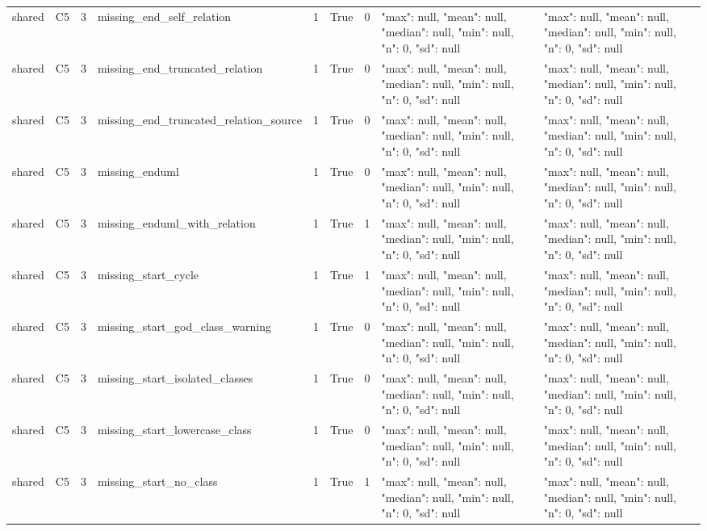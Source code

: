 \begin{tabular}{lllllllll}
shared & C5 & 3 & missing\_end\_self\_relation & 1 & True & 0 & {"max": null, "mean": null, "median": null, "min": null, "n": 0, "sd": null} & {"max": null, "mean": null, "median": null, "min": null, "n": 0, "sd": null} \\
shared & C5 & 3 & missing\_end\_truncated\_relation & 1 & True & 0 & {"max": null, "mean": null, "median": null, "min": null, "n": 0, "sd": null} & {"max": null, "mean": null, "median": null, "min": null, "n": 0, "sd": null} \\
shared & C5 & 3 & missing\_end\_truncated\_relation\_source & 1 & True & 0 & {"max": null, "mean": null, "median": null, "min": null, "n": 0, "sd": null} & {"max": null, "mean": null, "median": null, "min": null, "n": 0, "sd": null} \\
shared & C5 & 3 & missing\_enduml & 1 & True & 0 & {"max": null, "mean": null, "median": null, "min": null, "n": 0, "sd": null} & {"max": null, "mean": null, "median": null, "min": null, "n": 0, "sd": null} \\
shared & C5 & 3 & missing\_enduml\_with\_relation & 1 & True & 1 & {"max": null, "mean": null, "median": null, "min": null, "n": 0, "sd": null} & {"max": null, "mean": null, "median": null, "min": null, "n": 0, "sd": null} \\
shared & C5 & 3 & missing\_start\_cycle & 1 & True & 1 & {"max": null, "mean": null, "median": null, "min": null, "n": 0, "sd": null} & {"max": null, "mean": null, "median": null, "min": null, "n": 0, "sd": null} \\
shared & C5 & 3 & missing\_start\_god\_class\_warning & 1 & True & 0 & {"max": null, "mean": null, "median": null, "min": null, "n": 0, "sd": null} & {"max": null, "mean": null, "median": null, "min": null, "n": 0, "sd": null} \\
shared & C5 & 3 & missing\_start\_isolated\_classes & 1 & True & 0 & {"max": null, "mean": null, "median": null, "min": null, "n": 0, "sd": null} & {"max": null, "mean": null, "median": null, "min": null, "n": 0, "sd": null} \\
shared & C5 & 3 & missing\_start\_lowercase\_class & 1 & True & 0 & {"max": null, "mean": null, "median": null, "min": null, "n": 0, "sd": null} & {"max": null, "mean": null, "median": null, "min": null, "n": 0, "sd": null} \\
shared & C5 & 3 & missing\_start\_no\_class & 1 & True & 1 & {"max": null, "mean": null, "median": null, "min": null, "n": 0, "sd": null} & {"max": null, "mean": null, "median": null, "min": null, "n": 0, "sd": null} \\

\end{tabular}

